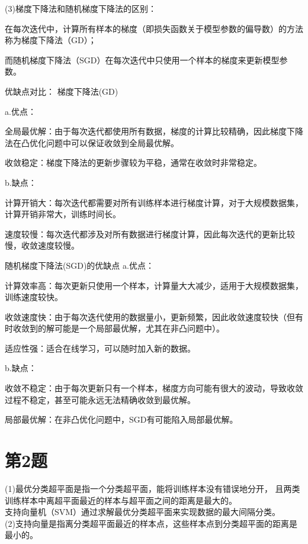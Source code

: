 \documentclass{article}
\begin{document}
(3)梯度下降法和随机梯度下降法的区别：

在每次迭代中，计算所有样本的梯度（即损失函数关于模型参数的偏导数）的方法称为梯度下降法（GD）；

而随机梯度下降法（SGD）在每次迭代中只使用一个样本的梯度来更新模型参数。


优缺点对比：
梯度下降法(GD)

a.优点：

全局最优解：由于每次迭代都使用所有数据，梯度的计算比较精确，因此梯度下降法在凸优化问题中可以保证收敛到全局最优解。

收敛稳定：梯度下降法的更新步骤较为平稳，通常在收敛时非常稳定。

b.缺点：

计算开销大：每次迭代都需要对所有训练样本进行梯度计算，对于大规模数据集，计算开销非常大，训练时间长。

速度较慢：每次迭代都涉及对所有数据进行梯度计算，因此每次迭代的更新比较慢，收敛速度较慢。

随机梯度下降法(SGD)的优缺点
a.优点：

计算效率高：每次更新只使用一个样本，计算量大大减少，适用于大规模数据集，训练速度较快。

收敛速度快：由于每次迭代使用的数据量小，更新频繁，因此收敛速度较快（但有时收敛到的解可能是一个局部最优解，尤其在非凸问题中）。

适应性强：适合在线学习，可以随时加入新的数据。

b.缺点：

收敛不稳定：由于每次更新只有一个样本，梯度方向可能有很大的波动，导致收敛过程不稳定，甚至可能永远无法精确收敛到最优解。

局部最优解：在非凸优化问题中，SGD有可能陷入局部最优解。

\section*{第2题}
(1)最优分类超平面是指一个分类超平面，能将训练样本没有错误地分开，
且两类训练样本中离超平面最近的样本与超平面之间的距离是最大的。\\
支持向量机（SVM）通过求解最优分类超平面来实现数据的最大间隔分类。\\
(2)支持向量是指离分类超平面最近的样本点，这些样本点到分类超平面的距离是最小的。
\end{document}
